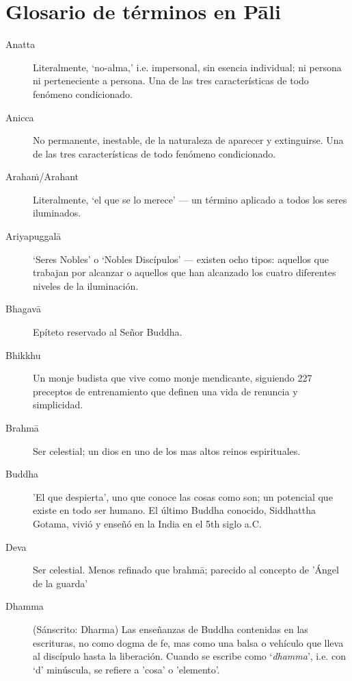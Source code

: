 \chapter{Glosario de términos en Pāli }

\enlargethispage{2\baselineskip}

\begin{description}

\item[Anatta] Literalmente, `no-alma,' i.e. impersonal, sin esencia individual;
 ni persona ni perteneciente a persona. Una de las tres características de todo fenómeno condicionado.

\item[Anicca] No permanente, inestable, de la naturaleza de aparecer y extinguirse. Una de las tres características de todo fenómeno condicionado.

\item[Arahaṁ/Arahant] Literalmente, ‘el que se lo merece’ --- un término aplicado a todos los seres iluminados. 

\item[Ariyapuggalā] ‘Seres Nobles’ o ‘Nobles Discípulos’ --- existen ocho tipos: aquellos que trabajan por alcanzar o aquellos que han alcanzado los cuatro diferentes niveles de la iluminación.

\item[Bhagavā] Epíteto reservado al Señor Buddha.

\item[Bhikkhu] Un monje budista que vive como monje mendicante, siguiendo 227 preceptos de entrenamiento que definen una vida de renuncia y simplicidad.

\item[Brahmā] Ser celestial; un dios en uno de los mas altos reinos espirituales.

\item[Buddha] 'El que despierta', uno que conoce las cosas como son; un potencial que existe en todo ser humano. El último Buddha conocido,
  Siddhattha Gotama, vivió y enseñó en la India en el 5th siglo a.C.

\item[Deva] Ser celestial. Menos refinado que brahmā; parecido al concepto de 'Ángel de la guarda'

\item[Dhamma] (Sánscrito: Dharma) Las enseñanzas de Buddha contenidas en las escrituras, no como dogma de fe, mas como una balsa o vehículo que lleva al discípulo hasta la liberación. Cuando se escribe como ‘\emph{dhamma}’, i.e.
  con `d' minúscula, se refiere a 'cosa’ o 'elemento'.


\end{description}
